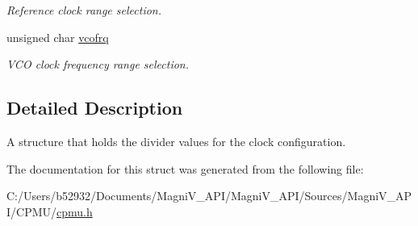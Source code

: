 \begin{DoxyCompactItemize}
\begin{DoxyCompactList}\small\item\em Reference clock range selection. \end{DoxyCompactList}\item 
\hypertarget{structclock__dividers_a43a20a81435bbc4e8e331e54ba6cb1cd}{}unsigned char \hyperlink{structclock__dividers_a43a20a81435bbc4e8e331e54ba6cb1cd}{vcofrq}\label{structclock__dividers_a43a20a81435bbc4e8e331e54ba6cb1cd}

\begin{DoxyCompactList}\small\item\em V\+C\+O clock frequency range selection. \end{DoxyCompactList}\end{DoxyCompactItemize}


\subsection{Detailed Description}
A structure that holds the divider values for the clock configuration. 

The documentation for this struct was generated from the following file\+:\begin{DoxyCompactItemize}
\item 
C\+:/\+Users/b52932/\+Documents/\+Magni\+V\+\_\+\+A\+P\+I/\+Magni\+V\+\_\+\+A\+P\+I/\+Sources/\+Magni\+V\+\_\+\+A\+P\+I/\+C\+P\+M\+U/\hyperlink{cpmu_8h}{cpmu.\+h}\end{DoxyCompactItemize}

